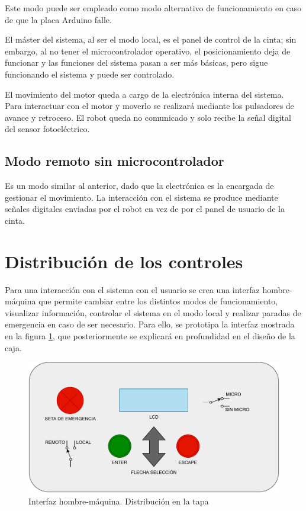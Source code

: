 Este modo puede ser empleado como modo alternativo de funcionamiento en caso de que la placa Arduino falle.

El máster del sistema, al ser el modo local, es el panel de control de la cinta; sin embargo, al no tener el microcontrolador operativo, el posicionamiento deja de funcionar y las funciones del sistema pasan a ser más básicas, pero sigue funcionando el sistema y puede ser controlado.

El movimiento del motor queda a cargo de la electrónica interna del sistema. Para interactuar con el motor y moverlo se realizará mediante los pulsadores de avance y retroceso. El robot queda no comunicado y solo recibe la señal digital del sensor fotoeléctrico.


\subsection{Modo remoto sin microcontrolador}\label{subsec-04}

Es un modo similar al anterior, dado que la electrónica es la encargada de gestionar el movimiento. La interacción con el sistema se produce mediante señales digitales enviadas por el robot en vez de por el panel de usuario de la cinta.

\section{Distribución de los controles}

Para una interacción con el sistema con el usuario se crea una interfaz hombre-máquina que permite cambiar entre los distintos modos de funcionamiento, visualizar información, controlar el sistema en el modo local y realizar paradas de emergencia en caso de ser necesario. Para ello, se prototipa la interfaz mostrada en la figura 
\ref{fig:interfazhmi}, que posteriormente se explicará en profundidad en el diseño de la caja.

\begin{figure}[htbp]
	\centering
	\includegraphics[width=\textwidth]{01-introduccion/HMI.pdf}
	\caption{Interfaz hombre-máquina. Distribución en la tapa}
	\label{fig:interfazhmi}
	\end{figure}


